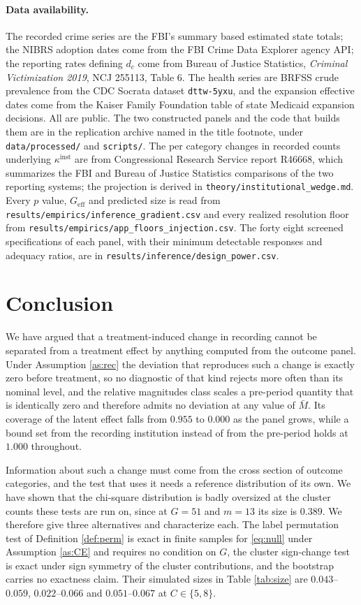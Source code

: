 \documentclass[12pt]{article}
\theoremstyle{definition}
\numberwithin{equation}{section}
\begin{document}
\paragraph{Data availability.} The recorded crime series are the FBI's
summary based estimated state totals; the NIBRS adoption dates come from the FBI
Crime Data Explorer agency API; the reporting rates defining $d_c$ come from
Bureau of Justice Statistics, \emph{Criminal Victimization 2019}, NCJ 255113,
Table 6. The health series are BRFSS crude prevalence from the CDC Socrata
dataset \texttt{dttw-5yxu}, and the expansion effective dates come from the
Kaiser Family Foundation table of state Medicaid expansion decisions. All are
public. The two constructed panels and the code that builds them are in the
replication archive named in the title footnote, under
\texttt{data/processed/} and \texttt{scripts/}. The per category changes in
recorded counts underlying $\kappa^{\mathrm{inst}}$ are from Congressional
Research Service report R46668, which summarizes the FBI and Bureau of Justice
Statistics comparisons of the two reporting systems; the projection is derived
in \texttt{theory/institutional\_wedge.md}. Every $p$ value,
$G_{\mathrm{eff}}$ and predicted size is read from
\texttt{results/empirics/inference\_gradient.csv} and every realized resolution
floor from \texttt{results/empirics/app\_floors\_injection.csv}. The forty
eight screened specifications of each panel, with their minimum detectable
responses and adequacy ratios, are in
\texttt{results/inference/design\_power.csv}.

\section{Conclusion}

We have argued that a treatment-induced change in recording cannot be separated
from a treatment effect by anything computed from the outcome panel. Under
Assumption \ref{as:rec} the deviation that reproduces such a change is exactly
zero before treatment, so no diagnostic of that kind rejects more often than its
nominal level, and the relative magnitudes class scales a pre-period quantity
that is identically zero and therefore admits no deviation at any value of
$\bar M$. Its coverage of the latent effect falls from $0.955$ to $0.000$ as the panel
grows, while a bound set from the recording institution instead of from the pre-period holds at $1.000$ throughout.

Information about such a change must come from the cross section of outcome
categories, and the test that uses it needs a reference distribution of its own.
We have shown that the chi-square distribution is badly oversized at the cluster
counts these tests are run on, since at $G = 51$ and $m = 13$ its size is
$0.389$. We therefore give three alternatives and characterize each. The label
permutation test of Definition \ref{def:perm} is exact in finite samples for
\eqref{eq:null} under Assumption \ref{as:CE} and requires no condition on $G$,
the cluster sign-change test is exact under sign symmetry of the cluster
contributions, and the bootstrap carries no exactness claim. Their simulated
sizes in Table \ref{tab:size} are $0.043$--$0.059$, $0.022$--$0.066$ and
$0.051$--$0.067$ at $C \in \{5,8\}$.
\end{document}
